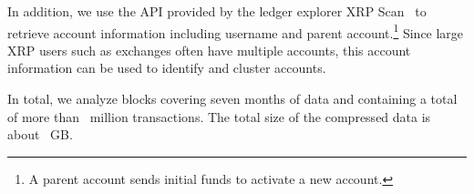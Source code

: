 In addition, we use the API provided by the ledger explorer XRP Scan~\cite{xrpscan} to retrieve account information including username and parent account.\footnote{A parent account sends initial funds to activate a new account.}
Since large XRP users such as exchanges often have multiple accounts, this account information can be used to identify and cluster accounts.

In total, we analyze \blockscount{\XRPStartBlock}{\XRPEndBlock} blocks covering seven months of data and containing a total of more than~ million transactions. The total size of the compressed data is about~ GB.










